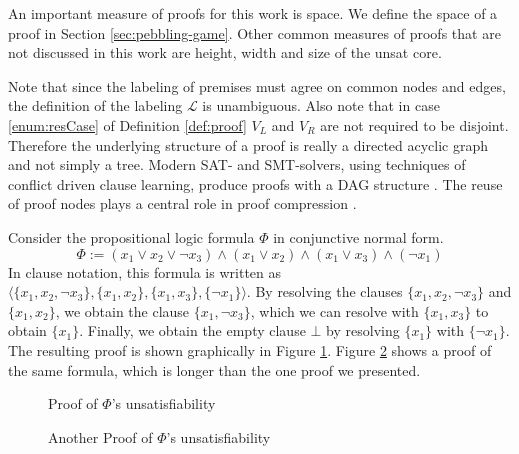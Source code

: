 An important measure of proofs for this work is space.
We define the space of a proof in Section \ref{sec:pebbling-game}.
Other common measures of proofs that are not discussed in this work are height, width and size of the unsat core.

\noindent
Note that since the labeling of premises must agree on common nodes and edges, the definition of the labeling $\mathcal{L}$ is unambiguous.
Also note that in case \ref{enum:resCase} of Definition \ref{def:proof} $V_L$ and $V_R$ are not required to be disjoint. 
Therefore the underlying structure of a proof is really a directed acyclic graph and not simply a tree. 
Modern SAT- and SMT-solvers, using techniques of conflict driven clause learning, produce proofs with a  DAG structure \cite{Bouton2009,Biere2009}.
The reuse of proof nodes plays a central role in proof compression \cite{Fontaine2011}.

\begin{example}

Consider the propositional logic formula $\Phi$ in conjunctive normal form.
$$\Phi := (x_1 \vee x_2 \vee \neg x_3) \wedge (x_1 \vee x_2) \wedge (x_1 \vee x_3) \wedge (\neg x_1)$$
In clause notation, this formula is written as $\langle \{x_1, x_2, \neg x_3\}, \{x_1, x_2\}, \{x_1, x_3\}, \{\neg x_1\} \rangle$.
By resolving the clauses $\{x_1, x_2, \neg x_3\}$ and $\{x_1, x_2\}$, we obtain the clause $\{x_1,\neg x_3\}$, which we can resolve with $\{x_1, x_3\}$ to obtain $\{x_1\}$.
Finally, we obtain the empty clause $\bot$ by resolving $\{x_1\}$ with $\{\neg x_1\}$.
The resulting proof is shown graphically in Figure \ref{fig:resolutionexample}.
Figure \ref{fig:resolutionexample2} shows a proof of the same formula, which is longer than the one proof we presented.

\begin{figure}[!h]


\caption{Proof of $\Phi$'s unsatisfiability}
\label{fig:resolutionexample}
\end{figure}

\begin{figure}[!h]


\caption{Another Proof of $\Phi$'s unsatisfiability}
\label{fig:resolutionexample2}
\end{figure}

\end{example}
